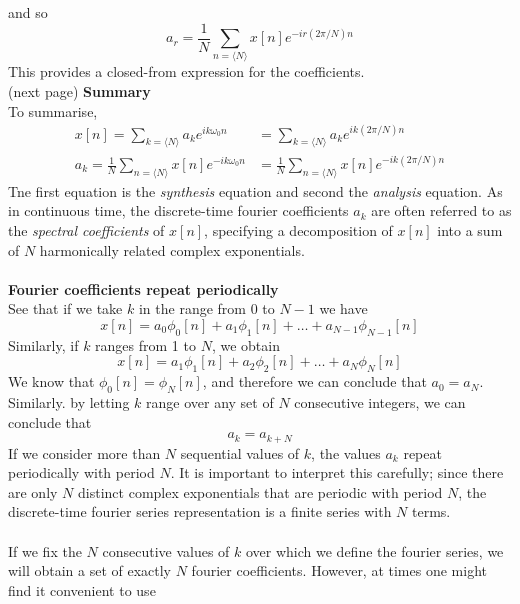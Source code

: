 \documentclass{report}
\begin{document}
and so
\begin{equation*}
a_r=\frac{1}{N}\sum_{n=\langle N\rangle}x[n]e^{-ir(2\pi/N)n}
\end{equation*}
This provides a closed-from expression for the coefficients.\\
(next page)\newpage
\noindent\textbf{Summary}\\
To summarise,
\begin{align*}
x[n]=\sum_{k=\langle N\rangle}a_ke^{ik\omega_0n}&=\sum_{k=\langle N\rangle}a_ke^{ik(2\pi/N)n}\\
a_k=\frac{1}{N}\sum_{n=\langle N\rangle}x[n]e^{-ik\omega_0n}&=
\frac{1}{N}\sum_{n=\langle N\rangle}x[n]e^{-ik(2\pi/N)n}
\end{align*}
Tne first equation is the \textit{synthesis} equation and second the \textit{analysis} equation. As in continuous time, the discrete-time fourier coefficients $a_k$ are often referred to as
the \textit{spectral coefficients} of $x[n]$, specifying a decomposition of $x[n]$ into a sum of $N$ harmonically related complex exponentials.\\
\vspace{1mm}\\
\textbf{Fourier coefficients repeat periodically}\\
See that if we take $k$ in the range from 0 to $N-1$ we have
\begin{equation*}
x[n]=a_0\phi_0[n]+a_1\phi_1[n]+\ldots+a_{N-1}\phi_{N-1}[n]
\end{equation*}
Similarly, if $k$ ranges from 1 to $N$, we obtain
\begin{equation*}
x[n]=a_1\phi_1[n]+a_{2}\phi_{2}[n]+\ldots+a_{N}\phi_{N}[n]
\end{equation*}
We know that $\phi_0[n]=\phi_N[n]$, and therefore we can conclude that $a_0=a_N$. Similarly. by letting $k$ range over any set of $N$ consecutive integers, we can conclude that
\begin{equation*}
a_k=a_{k+N}
\end{equation*}
If we consider more than $N$ sequential values of $k$, the values $a_k$ repeat periodically with period $N$. It is important to interpret this carefully; since there are only $N$ distinct complex
exponentials that are periodic with period $N$, the discrete-time fourier series representation is a finite series with $N$ terms.\\
\vspace{1mm}\\
If we fix the $N$ consecutive values of $k$ over which we define the fourier series, we will obtain a set of exactly $N$ fourier coefficients. However, at times one might find it convenient to use
\end{document}
